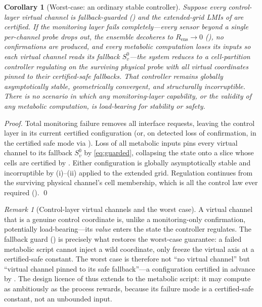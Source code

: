 \documentclass[11pt,a4paper,twocolumn]{article}
\theoremstyle{thmstyle}
\newtheorem{corollary}[theorem]{Corollary}
\theoremstyle{definition}
\theoremstyle{remark}
\newtheorem{remark}[theorem]{Remark}
\newcommand{\Rens}{R_{\mathrm{ens}}}
\begin{document}
\begin{corollary}[Worst-case: an ordinary stable controller]
\label{cor:worstcase}
Suppose every control-layer virtual channel is fallback-guarded
() and the extended-grid LMIs of
 are certified. If the monitoring layer fails
completely---every sensor beyond a single per-channel probe drops out, the
ensemble decoheres to $\Rens\to0$ (), no confirmations
are produced, and every metabolic computation loses its inputs so each
virtual channel reads its fallback $S_v^{0}$---the system reduces to a
cell-partition controller regulating on the surviving physical probe with
all virtual coordinates pinned to their certified-safe fallbacks. That
controller remains globally asymptotically stable, geometrically
convergent, and structurally incorruptible. There is no scenario in which
any monitoring-layer capability, or the validity of any metabolic
computation, is load-bearing for stability or safety.
\end{corollary}

\begin{proof}
Total monitoring failure removes all interface requests, leaving the
control layer in its current certified configuration (or, on detected
loss of confirmation, in the certified safe mode via ).
Loss of all metabolic inputs pins every virtual channel to its fallback
$S_v^{0}$ by \eqref{eq:guarded}, collapsing the state onto a slice whose
cells are certified by . Either configuration is
globally asymptotically stable and incorruptible by
(i)--(ii) applied to the extended grid. Regulation
continues from the surviving physical channel's cell membership, which is
all the control law ever required (). \qed
\end{proof}

\begin{remark}[Control-layer virtual channels and the worst case]
\label{rem:virtual-worstcase}
A virtual channel that is a genuine control coordinate is, unlike a
monitoring-only confirmation, potentially load-bearing---its \emph{value}
enters the state the controller regulates. The fallback guard
() is precisely what restores the worst-case
guarantee: a failed metabolic script cannot inject a wild coordinate,
only freeze the virtual axis at a certified-safe constant. The worst case
is therefore not ``no virtual channel'' but ``virtual channel pinned to
its safe fallback''---a configuration certified in advance by
. The design licence of  thus
extends to the metabolic script: it may compute as ambitiously as the
process rewards, because its failure mode is a certified-safe constant,
not an unbounded input.
\end{remark}
\end{document}
